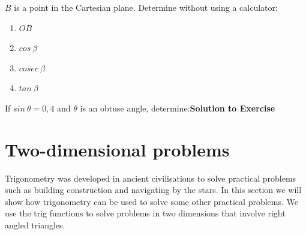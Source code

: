 
\begin{exercises}{}
{
$B$ is a point in the Cartesian plane. Determine without using a calculator:
\begin{enumerate}[noitemsep, label=\textbf{\arabic*}. ] 
 \item $OB$
\item $cos~\beta$
\item $cosec~\beta$
\item $tan~\beta$
\end{enumerate}

\vspace{10pt}
If $sin~\theta= 0,4$ and $\theta$ is an obtuse angle, determine:\label{m39408*eip-325}\noindent\textbf{Solution to Exercise }
\label{m39408*listfhsst!!!underscore!!!id1932}
}
\end{exercises}

\section{Two-dimensional problems}
Trigonometry was developed in ancient civilisations to solve practical problems such as building construction and navigating by the stars. In this section we will show how trigonometry can be used to solve some other practical problems. We use the trig functions to solve problems in two dimensions that involve right angled triangles. 

